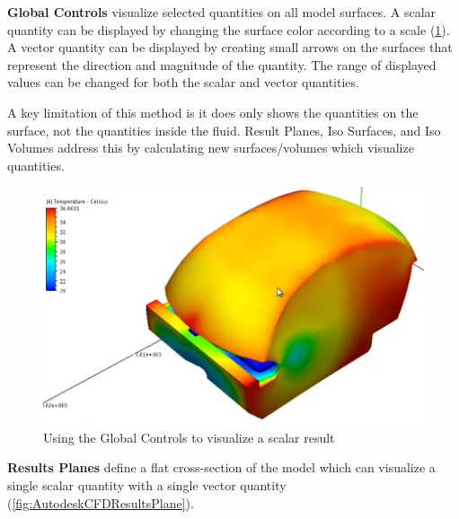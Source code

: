 \textbf{Global Controls}\cite[Global Controls]{AutodeskCFDManual} visualize selected quantities on all model surfaces.
A scalar quantity can be displayed by changing the surface color according to a scale (\cref{fig:AutodeskCFDGlobalControlsScalar}).
A vector quantity can be displayed by creating small arrows on the surfaces that represent the direction and magnitude of the quantity.
The range of displayed values can be changed for both the scalar and vector quantities.

A key limitation of this method is it does only shows the quantities on the surface, not the quantities inside the fluid.
Result Planes, Iso Surfaces, and Iso Volumes address this by calculating new surfaces/volumes which visualize quantities.

\begin{figure}
    \centering
    \includegraphics[width=\linewidth]{Ch20Research/figures/autodesk_cfd_global_results_scalar.PNG}
    \caption{Using the Global Controls to visualize a scalar result\cite{AutodeskCFDExercise7}}
    \label{fig:AutodeskCFDGlobalControlsScalar}
\end{figure}

\textbf{Results Planes}\cite[Planes]{AutodeskCFDManual} define a flat cross-section of the model which can visualize a single scalar quantity with a single vector quantity (\cref{fig:AutodeskCFDResultsPlane}).

